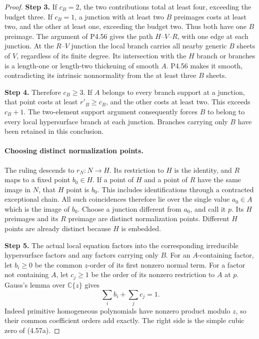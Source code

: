 \begin{proof}
\noindent\textbf{Step 3.} If $c_B=2$, the two contributions total at least four,
exceeding the budget three. If $c_B=1$, a junction with
at least two $B$ preimages costs at least two, and the
other at least one, exceeding the budget two. Thus both
have one $B$ preimage. The argument of P4.56 gives the
path $H$--$V$--$R$, with one edge at each junction.
At the $R$--$V$ junction the local branch carries all
nearby generic $B$ sheets of $V$, regardless of its
finite degree. Its intersection with the $H$ branch or
branches is a length-one or length-two thickening of
smooth $A$. P4.56 makes it smooth, contradicting its
intrinsic nonnormality from the at least three $B$ sheets.

\noindent\textbf{Step 4.} Therefore $c_B\ge3$. If $A$ belongs to every branch
support at a junction, that point costs at least
$r'_B\ge c_B$, and the other costs at least two.
This exceeds $c_B+1$. The two-element support argument
consequently forces $B$ to belong to every local
hypersurface branch at each junction. Branches carrying
only $B$ have been retained in this conclusion.

\paragraph{Choosing distinct normalization points.}
The ruling descends to $r_N:N\to H$. Its restriction
to $H$ is the identity, and $R$ maps to a fixed point
$b_0\in H$. If a point of $H$ and a point of $R$ have
the same image in $N$, that $H$ point is $b_0$.
This includes identifications through a contracted
exceptional chain. All such coincidences therefore lie
over the single value $a_0\in A$ which is the image of
$b_0$. Choose a junction different from $a_0$, and call
it $p$. Its $H$ preimages and its $R$ preimage are
distinct normalization points. Different $H$ points
are already distinct because $H$ is embedded.

\noindent\textbf{Step 5.} The actual local equation factors into the corresponding
irreducible hypersurface factors and any factors carrying
only $B$. For an $A$-containing factor, let $b_i\ge0$
be the common $z$-order of its first nonzero normal term.
For a factor not containing $A$, let $c_j\ge1$ be the
order of its nonzero restriction to $A$ at $p$.
Gauss's lemma over $\mathbb C\{z\}$ gives
\[
                         \sum_i b_i+\sum_j c_j=1.         \tag{4.57b}
\]
Indeed primitive homogeneous polynomials have nonzero
product modulo $z$, so their common coefficient orders
add exactly. The right side is the simple cubic zero
of (4.57a).


\end{proof}
